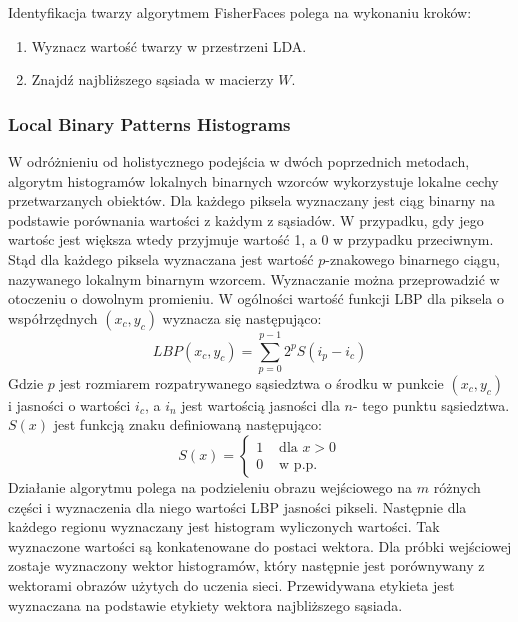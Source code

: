 Identyfikacja twarzy algorytmem FisherFaces polega na wykonaniu kroków:
\begin{enumerate}
\item Wyznacz wartość twarzy w przestrzeni LDA.
\item Znajdź najbliższego sąsiada w macierzy $W$.
\end{enumerate}

\subsubsection{Local Binary Patterns Histograms} \label{lbph}
W odróżnieniu od holistycznego podejścia w dwóch poprzednich metodach, algorytm histogramów lokalnych binarnych wzorców wykorzystuje lokalne cechy przetwarzanych obiektów.
Dla każdego piksela wyznaczany jest ciąg binarny na podstawie porównania wartości z każdym z sąsiadów. W przypadku, gdy jego wartośc jest większa wtedy przyjmuje wartość 1, a 0 w przypadku przeciwnym. Stąd dla każdego piksela wyznaczana jest wartość $p$-znakowego binarnego ciągu, nazywanego lokalnym binarnym wzorcem.  Wyznaczanie można przeprowadzić w otoczeniu o dowolnym promieniu. W ogólności wartość funkcji LBP dla piksela o współrzędnych $(x_{c},y_{c})$ wyznacza się następująco: 
$$
LBP(x_{c},y_{c})=\sum_{p=0}^{p-1}2^{p}S(i_{p}-i_{c})
$$
Gdzie $p$ jest rozmiarem rozpatrywanego sąsiedztwa o środku w punkcie $(x_{c},y_{c})$ i jasności o wartości $i_{c}$, a $i_{n}$ jest wartością jasności dla $n$- tego punktu sąsiedztwa.
$S(x)$ jest funkcją znaku definiowaną następująco:
$$
S(x) = \left\{ \begin{array}{ll}
1 & \textrm{ dla $x>0$}\\
0 & \textrm{ w p.p.}
\end{array} \right.
$$
Działanie algorytmu polega na podzieleniu obrazu wejściowego na $m$ różnych części i wyznaczenia dla niego wartości LBP jasności pikseli. Następnie dla każdego regionu wyznaczany jest histogram wyliczonych wartości. Tak wyznaczone wartości są konkatenowane do postaci wektora.
Dla próbki wejściowej zostaje wyznaczony wektor histogramów, który następnie jest porównywany z wektorami obrazów użytych do uczenia sieci. Przewidywana etykieta jest wyznaczana na podstawie etykiety wektora najbliższego sąsiada.

